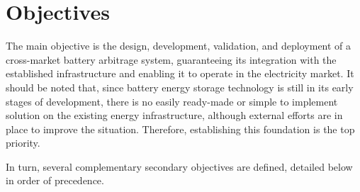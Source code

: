 \section*{Objectives}%
\label{makereference9.1}

The main objective is the design, development, validation, and deployment of a cross-market battery arbitrage system, guaranteeing its integration with the established infrastructure and enabling it to operate in the electricity market. It should be noted that, since battery energy storage technology is still in its early stages of development, there is no easily ready-made or simple to implement solution on the existing energy infrastructure, although external efforts are in place to improve the situation. Therefore, establishing this foundation is the top priority.

In turn, several complementary secondary objectives are defined, detailed below in order of precedence.

